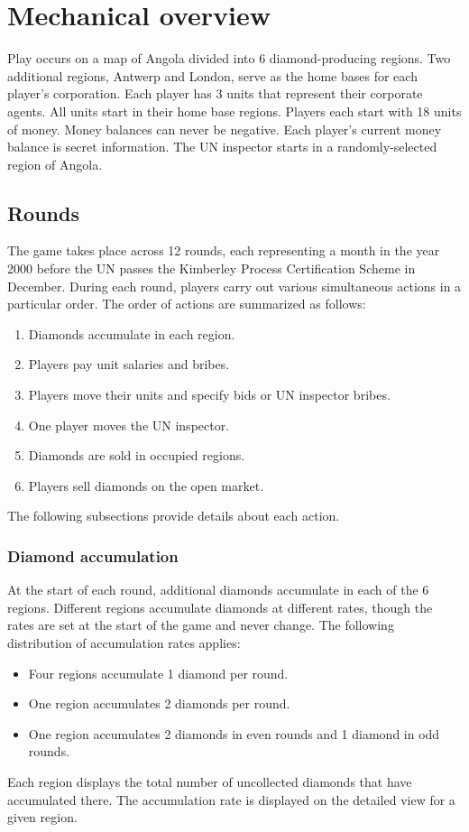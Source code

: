 \documentclass[12pt]{article}
\begin{document}
\section{Mechanical overview}

Play occurs on a map of Angola divided into 6 diamond-producing regions.  Two additional regions, Antwerp and London, serve as the home bases for each player's corporation.  Each player has 3 units that represent their corporate agents.  All units start in their home base regions.  Players each start with 18 units of money.  Money balances can never be negative.  Each player's current money balance is secret information.  The UN inspector starts in a randomly-selected region of Angola.


\subsection{Rounds}

The game takes place across 12 rounds, each representing a month in the year 2000 before the UN passes the Kimberley Process Certification Scheme in December.  During each round, players carry out various simultaneous actions in a particular order.  The order of actions are summarized as follows:
\begin{enumerate}

\item Diamonds accumulate in each region.
\item Players pay unit salaries and bribes.
\item Players move their units and specify bids or UN inspector bribes.
\item One player moves the UN inspector.
\item Diamonds are sold in occupied regions.
\item Players sell diamonds on the open market. 
\end{enumerate}
The following subsections provide details about each action.  


\subsubsection{Diamond accumulation}

At the start of each round, additional diamonds accumulate in each of the 6 regions.  Different regions accumulate diamonds at different rates, though the rates are set at the start of the game and never change.  The following distribution of accumulation rates applies:
\begin{itemize}
\item Four regions accumulate 1 diamond per round.
\item One region accumulates 2 diamonds per round.
\item One region accumulates 2 diamonds in even rounds and 1 diamond in odd rounds.
\end{itemize}
Each region displays the total number of uncollected diamonds that have accumulated there.  The accumulation rate is displayed on the detailed view for a given region.
\end{document}
